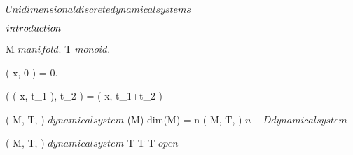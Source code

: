 \documentclass[../m.tex]{subfiles}
\begin{document}
\unit{ $ Unidimensional discrete dynamical systems $ }
{
	\introduction
	{ 
		$introduction\\$ 
	}

	{
		{
			M $ manifold $.
			T $ monoid $.
		}
		{
			{
				\phi( x, 0 ) = 0.

				{
					\phi( \phi( x, t_1 ), t_2 ) = \phi( x, t_1+t_2 )
				}
			}
		}

	}
	{
		{
			( M, T, \phi ) $ dynamical system $
		}
		{
			\dim(M)
		}
		\denote
		{
			dim(M) = n \as ( M, T, \phi ) $ n-D dynamical system $
		}
	}


	{
		{
			( M, T, \phi ) $ dynamical system $
		}
		{
			T \countable
		}
		{
			T \subset \R \suchthat T $ open $
		}
	}

}
\end{document}
